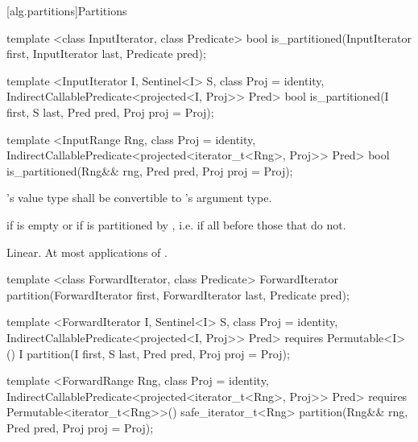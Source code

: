 [alg.partitions]{Partitions}

%
\begin{removedblock}
\begin{itemdecl}
template <class InputIterator, class Predicate>
  bool is_partitioned(InputIterator first, InputIterator last, Predicate pred);
\end{itemdecl}
\end{removedblock}
\begin{addedblock}
\begin{itemdecl}
template <InputIterator I, Sentinel<I> S, class Proj = identity,
    IndirectCallablePredicate<projected<I, Proj>> Pred>
  bool is_partitioned(I first, S last, Pred pred, Proj proj = Proj{});

template <InputRange Rng, class Proj = identity,
    IndirectCallablePredicate<projected<iterator_t<Rng>, Proj>> Pred>
  bool
    is_partitioned(Rng&& rng, Pred pred, Proj proj = Proj{});
\end{itemdecl}
\end{addedblock}

\begin{itemdescr}
\begin{removedblock}
\pnum
\requires {}'s value type shall be convertible to 's argument type.
\end{removedblock}

\pnum
\returns {} if
 is empty or if
 is partitioned by , i.e. if all
 before those that do not.

\pnum
\complexity Linear. At most  applications of .
\end{itemdescr}

%
\begin{removedblock}
\begin{itemdecl}
template <class ForwardIterator, class Predicate>
  ForwardIterator
    partition(ForwardIterator first,
              ForwardIterator last, Predicate pred);
\end{itemdecl}
\end{removedblock}
\begin{addedblock}
\begin{itemdecl}
template <ForwardIterator I, Sentinel<I> S, class Proj = identity,
    IndirectCallablePredicate<projected<I, Proj>> Pred>
  requires Permutable<I>()
  I partition(I first, S last, Pred pred, Proj proj = Proj{});

template <ForwardRange Rng, class Proj = identity,
    IndirectCallablePredicate<projected<iterator_t<Rng>, Proj>> Pred>
  requires Permutable<iterator_t<Rng>>()
  safe_iterator_t<Rng>
    partition(Rng&& rng, Pred pred, Proj proj = Proj{});
\end{itemdecl}
\end{addedblock}

